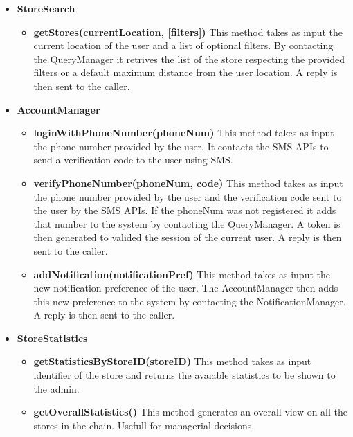\begin{itemize}
    \item \textbf{StoreSearch}
    \begin{itemize}
        \item \textbf{getStores(currentLocation, [filters])}
        This method takes as input the current location of the user and a list of optional filters. By contacting the QueryManager it retrives the list of the store respecting the provided filters or a default maximum distance from the user location.
        A reply is then sent to the caller. 
    \end{itemize}

    \item \textbf{AccountManager}
    \begin{itemize}
        \item \textbf{loginWithPhoneNumber(phoneNum)}
        This method takes as input the phone number provided by the user. It contacts the SMS APIs to send a verification code to the user using SMS.

        \item \textbf{verifyPhoneNumber(phoneNum, code)}
        This method takes as input the phone number provided by the user and the verification code sent to the user by the SMS APIs. If the phoneNum was not registered it adds that number to the system by contacting the QueryManager.
        A token is then generated to valided the session of the current user. A reply is then sent to the caller. 

        \item \textbf{addNotification(notificationPref)}
        This method takes as input the new notification preference of the user. The AccountManager then adds this new preference to the system by contacting the NotificationManager. A reply is then sent to the caller. 
    \end{itemize}

    \item \textbf{StoreStatistics}
    \begin{itemize}
        \item \textbf{getStatisticsByStoreID(storeID)}
        This method takes as input identifier of the store and returns the avaiable statistics to be shown to the admin. 
        \item \textbf{getOverallStatistics()}
        This method generates an overall view on all the stores in the chain. Usefull for managerial decisions.
    \end{itemize}


\end{itemize}
